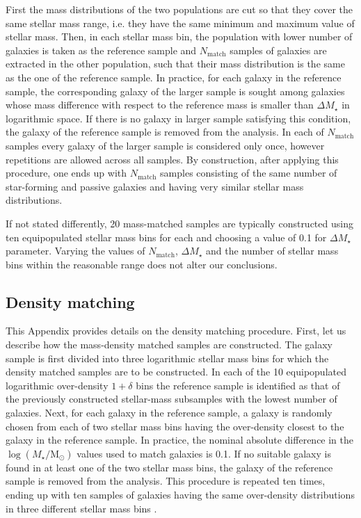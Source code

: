 \documentclass[useAMS,usenatbib]{mnras}
\newcommand{\Mstardot}{M\ensuremath{_{\star}} / \mathrm{M}\ensuremath{_{\odot}}}
\begin{document}
First the mass distributions of the two populations are cut so that they cover the same stellar mass range, i.e. they have the same minimum and maximum value of stellar mass. Then, in each stellar mass bin, the population with lower number of galaxies is taken as the reference sample and $N_{\mathrm{match}}$ samples of galaxies are extracted in the other population, such that their mass distribution is the same as the one of the reference sample. In practice, for each galaxy in the reference sample, the corresponding galaxy of the larger sample is sought among galaxies whose mass difference with respect to the reference mass is smaller than $\Delta M_{\star}$ in logarithmic space. 
If there is no galaxy in larger sample satisfying this condition, the galaxy of the reference sample is removed from the analysis. 
In each of $N_{\mathrm{match}}$ samples every galaxy of the larger sample is considered only once, however repetitions are allowed across all samples. 
By construction, after applying this procedure, one ends up with $N_{\mathrm{match}}$ samples consisting of the same number of star-forming and passive galaxies and having very similar stellar mass distributions. 

If not stated differently, 20 mass-matched samples are typically constructed using ten equipopulated stellar mass bins for each and choosing a value of 0.1 for  $\Delta M_{\star}$ parameter. Varying the values of  $N_{\mathrm{match}}$, $\Delta M_{\star}$ and the number of stellar mass bins within the reasonable range does not alter our conclusions.

\subsection{Density matching}
\label{subsec:appendix_dmatching}

This Appendix provides details on the density matching procedure. First, let us describe how the mass-density matched samples are constructed. The galaxy sample is first divided into three logarithmic stellar mass bins for which the density matched samples are to be constructed. In each of the 10 equipopulated logarithmic over-density $1+\delta$ bins the reference sample is identified as that of the previously constructed  stellar-mass subsamples with the lowest number of galaxies.
Next, for each galaxy in the reference sample, a galaxy is randomly chosen from each of two stellar mass bins having the over-density closest to the galaxy in the reference sample. In practice, the nominal absolute difference in the $\log (\Mstardot)$ values used to match galaxies is 0.1. If no suitable galaxy is found in at least one of the two stellar mass bins, the galaxy of the reference sample is removed from the analysis. This procedure is repeated ten times, ending up with ten samples of galaxies having the same over-density distributions in three different stellar mass bins . 
\end{document}
